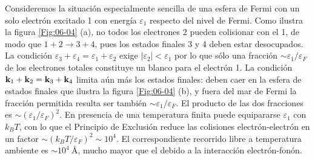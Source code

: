 Consideremos la situación especialmente sencilla de una esfera de Fermi con un solo electrón excitado 1 con energía $\varepsilon_1$ respecto del nivel de Fermi. Como ilustra la figura \ref{Fig:06-04} (a), no todos los electrones 2 pueden colisionar con el 1, de modo que $1+2\rightarrow3+4$, pues los estados finales 3 y 4 deben estar desocupados. La condición $\varepsilon_3 + \varepsilon_4 = \varepsilon_1 + \varepsilon_2$ exige $|\varepsilon_2|<\varepsilon_1$ por lo que sólo una fracción $\sim \varepsilon_1 / \varepsilon_F$ de los electrones totales constituye un blanco para el electrón 1. La condición $\mathbf{k}_1 + \mathbf{k}_2 = \mathbf{k}_3 + \mathbf{k}_4$ limita aún más los estados finales: deben caer en la esfera de estados finales que ilustra la figura \ref{Fig:06-04} (b), y fuera del mar de Fermi la fracción permitida resulta ser también $\sim \varepsilon_1 / \varepsilon_F$. El producto de las dos fracciones es $\sim (\varepsilon_1/\varepsilon_F)^2$. 
En presencia de una temperatura finita puede equipararse $\varepsilon_1$ con $k_BT$, con lo que el Principio de Exclusión reduce las colisiones electrón-electrón en un factor $\sim (k_BT/\varepsilon_F)^2 \sim 10^4$. El correspondiente recorrido libre a temperatura ambiente es $\sim 10^4 \ \unit{\angstrom}$, mucho mayor que el debido a la interacción electrón-fonón.
